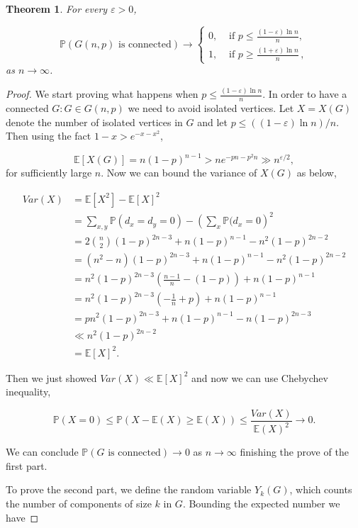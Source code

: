 \documentclass[12pt,twoside,a4paper,bibliography=totocnumbered]{book}
\numberwithin{equation}{section}
\let\log=\ln
\newtheorem{theorem}             {Theorem}[section]
\theoremstyle{remark}
\begin{document}
\begin{theorem}
For every $\varepsilon > 0$,

$$
\mathbb{P}(G(n,p)\text{ is connected}) \rightarrow 
\begin{cases}
		0, &\text{ if }p \leq \frac{(1 - \varepsilon) \log n}{n},\\
		1, &\text{ if }p \geq \frac{(1 + \varepsilon) \log n}{n}\,,
\end{cases}
$$
as $n \rightarrow \infty$.
\end{theorem}
\begin{proof}
We start proving what happens when $p \leq \frac{(1 - \varepsilon) \log n}{n}$. In order to have a connected $G\colon G \in G(n,p)$ we need to avoid isolated vertices. Let $X=X(G)$ denote the number of isolated vertices in $G$ and let $p\leq((1-\varepsilon) \log n) /n$. Then using the fact $1-x > e^{-x-x^2}$,

$$ \mathbb{E}[X(G)] = n(1-p)^{n-1} > ne^{-pn-p^2n} \gg n^{\varepsilon/2},$$
for sufficiently large $n$. Now we can bound the variance of $X(G)$ as below,

\begin{align*}
Var(X) &= \mathbb{E}[X^2 ] - \mathbb{E}[X]^2\\
&= \sum_{x,y} \mathbb{P}(d_x = d_y =0) - \left( \sum_x \mathbb{P}(d_x = 0\right)^2\\
& = 2\binom{n}{2} (1-p)^{2n-3} + n(1-p)^{n-1} - n^2(1-p)^{2n-2}\\
& = (n^2 - n)(1-p)^{2n-3} + n(1-p)^{n-1} - n^2(1-p)^{2n-2}\\
& = n^2(1-p)^{2n-3}\left( \frac{n-1}{n} - (1-p) \right) + n(1-p)^{n-1}\\
& = n^2(1-p)^{2n-3}\left( -\frac{1}{n} + p \right) + n(1-p)^{n-1}\\
& = pn^2 (1-p)^{2n-3} + n(1-p)^{n-1} - n(1-p)^{2n-3}\\
& \ll n^2 (1-p)^{2n-2}\\
& = \mathbb{E}[X]^2.
\end{align*}

Then we just showed $Var(X) \ll \mathbb{E}[X]^2$ and now we can use Chebychev  inequality,

$$\mathbb{P}(X=0) \leq \mathbb{P} (X-\mathbb{E}(X) \geq \mathbb{E}(X)) \leq \frac{Var(X)}{\mathbb{E}(X)^2} \rightarrow 0.$$

We can conclude $\mathbb{P}(G\text{ is connected}) \rightarrow 0$ as $n \rightarrow \infty$ finishing the prove of the first part.

To prove the second part, we define the random variable $Y_k(G)$, which counts the number of components of size $k$ in $G$. Bounding the expected number we have


\end{proof}
\end{document}
